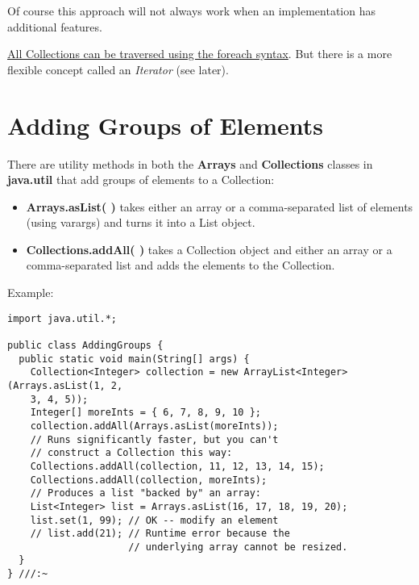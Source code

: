\documentclass[10pt,letterpaper]{report}
\begin{document}
Of course this approach will not always work when an implementation has additional features.

\underline{All Collections can be traversed using the foreach syntax}. But there is a more flexible concept called an \textit{Iterator} (see later).

\section{Adding Groups of Elements}
There are utility methods in both the \textbf{Arrays} and \textbf{Collections} classes in \textbf{java.util} that add groups of elements to a Collection:
\begin{itemize}
\item \textbf{Arrays.asList( )} takes either an array or a comma-separated list of elements (using varargs) and turns it into a List object.
\item \textbf{Collections.addAll( )} takes a Collection object and either an array or a comma-separated list and adds the elements to the Collection.
\end{itemize}
Example:
\begin{lstlisting}
import java.util.*;

public class AddingGroups {
  public static void main(String[] args) {
    Collection<Integer> collection = new ArrayList<Integer>(Arrays.asList(1, 2,
    3, 4, 5));
    Integer[] moreInts = { 6, 7, 8, 9, 10 };
    collection.addAll(Arrays.asList(moreInts));
    // Runs significantly faster, but you can't
    // construct a Collection this way:
    Collections.addAll(collection, 11, 12, 13, 14, 15);
    Collections.addAll(collection, moreInts);
    // Produces a list "backed by" an array:
    List<Integer> list = Arrays.asList(16, 17, 18, 19, 20);
    list.set(1, 99); // OK -- modify an element
    // list.add(21); // Runtime error because the
                     // underlying array cannot be resized.
  }
} ///:~
\end{lstlisting}
\end{document}

